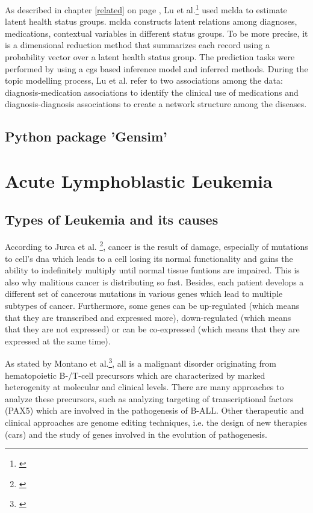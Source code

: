 As described in chapter \ref{related} on page \pageref{related}, Lu et al.\footnote{\autocite{lu_2016}} used \gls{mclda} to estimate latent health status groups. \gls{mclda} constructs latent relations among diagnoses, medications, contextual variables in different status groups. To be more precise, it is a dimensional reduction method that summarizes each record using a probability vector over a latent health status group. The prediction tasks were performed by using a \gls{cgs} based inference model and inferred methods. 
During the topic modelling process, Lu et al. refer to two associations among the data: diagnosis-medication associations to identify the clinical use of medications and diagnosis-diagnosis associations to create a network structure among the diseases.
 
\section{Python package 'Gensim'}\label{gensim}
              
\chapter{Acute Lymphoblastic Leukemia}\label{all}
\section{Types of Leukemia and its causes}\label{leukemia_types}
According to Jurca et al. \footnote{\autocite{jurca_2016}}, cancer is the result of damage, especially of mutations to cell's \gls{dna} which leads to a cell losing its normal functionality and gains the ability to indefinitely multiply until normal tissue funtions are impaired. This is also why malitious cancer is distributing so fast. Besides, each patient develops a different set of cancerous mutations in various genes which lead to multiple subtypes of cancer.
Furthermore, some genes can be up-regulated (which means that they are transcribed and expressed more), down-regulated (which means that they are not expressed) or can be co-expressed (which means that they are expressed at the same time).

As stated by Montano et al.\footnote{\autocite{montano_2018}}, \gls{all} is a malignant disorder originating from hematopoietic B-/T-cell precursors which are characterized by marked heterogenity at molecular and clinical levels. There are many approaches to analyze these precursors, such as analyzing targeting of transcriptional factors (PAX5) which are involved in the pathogenesis of B-ALL. Other therapeutic and clinical approaches are genome editing techniques, i.e. the design of new therapies (\gls{car}s) and the study of genes involved in the evolution of pathogenesis.

